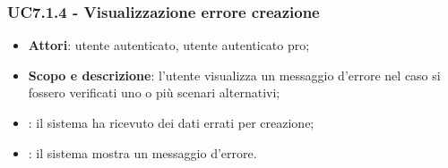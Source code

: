 	\subsubsection{UC7.1.4 - Visualizzazione errore creazione}
	\begin{itemize}
		\item
			\textbf{Attori}: utente autenticato, utente autenticato pro;
		\item
			\textbf{Scopo e descrizione}: l'utente visualizza un messaggio d'errore nel caso si fossero verificati uno o più scenari alternativi;
		\item		
			: il sistema ha ricevuto dei dati errati per creazione;
		\item
			: il sistema mostra un messaggio d'errore.
	\end{itemize}	
